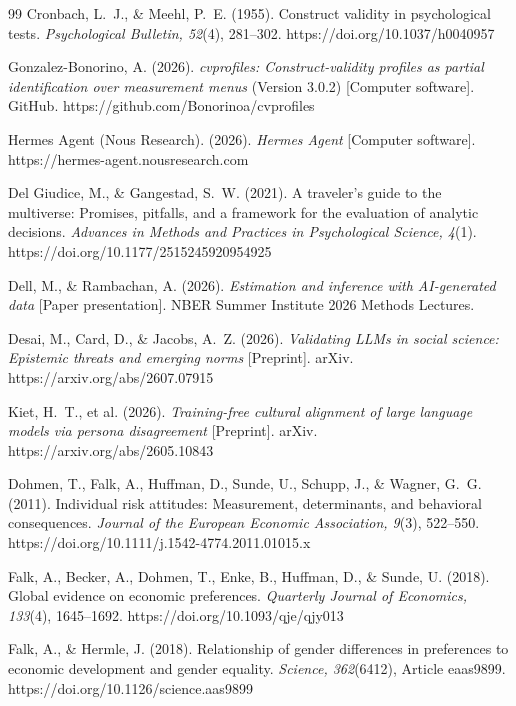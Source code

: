 \documentclass[10pt,letterpaper]{article}
\begin{document}
\begin{thebibliography}{99}
 Cronbach, L.~J., \& Meehl, P.~E. (1955). Construct validity in psychological tests. \textit{Psychological Bulletin, 52}(4), 281--302. https://doi.org/10.1037/h0040957

 Gonzalez-Bonorino, A. (2026). \textit{cvprofiles: Construct-validity profiles as partial identification over measurement menus} (Version 3.0.2) [Computer software]. GitHub. https://github.com/Bonorinoa/cvprofiles

 Hermes Agent (Nous Research). (2026). \textit{Hermes Agent} [Computer software]. https://hermes-agent.nousresearch.com

 Del Giudice, M., \& Gangestad, S.~W. (2021). A traveler's guide to the multiverse: Promises, pitfalls, and a framework for the evaluation of analytic decisions. \textit{Advances in Methods and Practices in Psychological Science, 4}(1). https://doi.org/10.1177/2515245920954925

 Dell, M., \& Rambachan, A. (2026). \textit{Estimation and inference with AI-generated data} [Paper presentation]. NBER Summer Institute 2026 Methods Lectures.

 Desai, M., Card, D., \& Jacobs, A.~Z. (2026). \textit{Validating LLMs in social science: Epistemic threats and emerging norms} [Preprint]. arXiv. https://arxiv.org/abs/2607.07915

 Kiet, H.~T., et al. (2026). \textit{Training-free cultural alignment of large language models via persona disagreement} [Preprint]. arXiv. https://arxiv.org/abs/2605.10843

 Dohmen, T., Falk, A., Huffman, D., Sunde, U., Schupp, J., \& Wagner, G.~G. (2011). Individual risk attitudes: Measurement, determinants, and behavioral consequences. \textit{Journal of the European Economic Association, 9}(3), 522--550. https://doi.org/10.1111/j.1542-4774.2011.01015.x

 Falk, A., Becker, A., Dohmen, T., Enke, B., Huffman, D., \& Sunde, U. (2018). Global evidence on economic preferences. \textit{Quarterly Journal of Economics, 133}(4), 1645--1692. https://doi.org/10.1093/qje/qjy013

 Falk, A., \& Hermle, J. (2018). Relationship of gender differences in preferences to economic development and gender equality. \textit{Science, 362}(6412), Article eaas9899. https://doi.org/10.1126/science.aas9899


\end{thebibliography}
\end{document}
